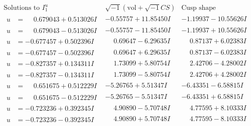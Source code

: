 \documentclass[1p]{elsarticle_modified}
\theoremstyle{definition}
\newcommand{\I}{\sqrt{-1}}
\begin{document}
$$\begin{array}{c|c|c}  
\text{Solutions to }I^u_{1}& \I (\text{vol} + \sqrt{-1}CS) & \text{Cusp shape}\\
 \hline 
\begin{aligned}
u &= \phantom{-}0.679043 + 0.513026 I\end{aligned}
 & -0.55757 + 11.85450 I & -1.19937 - 10.55626 I \\ \hline\begin{aligned}
u &= \phantom{-}0.679043 - 0.513026 I\end{aligned}
 & -0.55757 - 11.85450 I & -1.19937 + 10.55626 I \\ \hline\begin{aligned}
u &= -0.677457 + 0.502396 I\end{aligned}
 & \phantom{-}0.69647 - 6.29635 I & \phantom{-}0.87137 + 6.02383 I \\ \hline\begin{aligned}
u &= -0.677457 - 0.502396 I\end{aligned}
 & \phantom{-}0.69647 + 6.29635 I & \phantom{-}0.87137 - 6.02383 I \\ \hline\begin{aligned}
u &= -0.827357 + 0.134311 I\end{aligned}
 & \phantom{-}1.73099 + 5.80754 I & \phantom{-}2.42706 - 4.28002 I \\ \hline\begin{aligned}
u &= -0.827357 - 0.134311 I\end{aligned}
 & \phantom{-}1.73099 - 5.80754 I & \phantom{-}2.42706 + 4.28002 I \\ \hline\begin{aligned}
u &= \phantom{-}0.651675 + 0.512229 I\end{aligned}
 & -5.26765 + 5.51347 I & -6.43351 - 6.58815 I \\ \hline\begin{aligned}
u &= \phantom{-}0.651675 - 0.512229 I\end{aligned}
 & -5.26765 - 5.51347 I & -6.43351 + 6.58815 I \\ \hline\begin{aligned}
u &= -0.723236 + 0.392345 I\end{aligned}
 & \phantom{-}4.90890 - 5.70748 I & \phantom{-}4.77595 + 8.10333 I \\ \hline\begin{aligned}
u &= -0.723236 - 0.392345 I\end{aligned}
 & \phantom{-}4.90890 + 5.70748 I & \phantom{-}4.77595 - 8.10333 I \\ \hline\begin{aligned}

\end{aligned}
\end{array}$$
\end{document}
